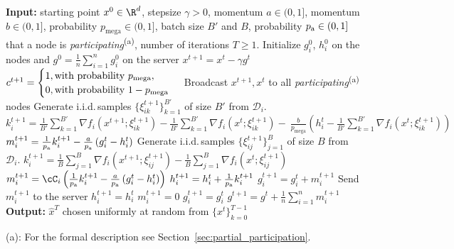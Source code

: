 \documentclass{article}
\newcommand{\algorithmname}{DASHA-PP}
\newcommand*{\probavailable}{\ensuremath{p_{\textnormal{a}}}}
\newcommand*{\probmega}{\ensuremath{p_{\text{mega}}}}
\begin{document}
  \begin{algorithm}[h]
      \caption{\algname{\algorithmname-SYNC-MVR}}
      \label{alg:main_algorithm_mvr_sync}
      \begin{algorithmic}[1]
      \STATE \textbf{Input:} starting point $x^0 \in \R^d$, stepsize $\gamma > 0$, momentum $a \in (0, 1]$, momentum $b \in (0, 1]$, probability $\probmega \in (0, 1]$, batch size $B'$ and $B$, probability $\probavailable \in (0, 1]$ that a node is \textit{participating}\textsuperscript{\red (a)}, number of iterations $T \geq 1$.
      \STATE Initialize $g^0_i$, $h^0_i$ on the nodes and $g^0 = \frac{1}{n}\sum_{i=1}^n g^0_i$ on the server
      \STATE $x^{t+1} = x^t - \gamma g^t$
      \STATE $c^{t+1} = 
      \begin{cases}
          1, \textnormal{with probability $\probmega$}, \\
          0, \textnormal{with probability $1 - \probmega$}
      \end{cases}$
      \STATE Broadcast $x^{t+1}, x^{t}$ to all \textit{participating}\textsuperscript{\red (a)} nodes
              \STATE Generate i.i.d.\,samples $\{\xi_{ik}^{t+1}\}_{k=1}^{B'}$ of size $B'$ from $\mathcal{D}_i.$
              \STATE $k^{t+1}_i = \frac{1}{B'} \sum_{k=1}^{B'} \nabla f_i(x^{t+1};\xi_{ik}^{t+1}) - \frac{1}{B'} \sum_{k=1}^{B'} \nabla f_i(x^{t};\xi_{ik}^{t+1})-~\frac{b}{\probmega}\left(h^t_i - \frac{1}{B'} \sum_{k=1}^{B'} \nabla f_i(x^{t};\xi_{ik}^{t+1})\right)$
              \STATE $m^{t+1}_i = \frac{1}{\probavailable}k^{t+1}_i - \frac{a}{\probavailable} \left(g^t_i - h^t_i\right)$ 
          \ELSE
              \STATE Generate i.i.d.\,samples $\{\xi^{t+1}_{ij}\}_{j=1}^B$ of size $B$ from $\mathcal{D}_i.$
              \STATE $k^{t+1}_i = \frac{1}{B} \sum_{j=1}^{B}\nabla f_i(x^{t+1};\xi^{t+1}_{ij}) - \frac{1}{B} \sum_{j=1}^{B}\nabla f_i(x^{t};\xi^{t+1}_{ij})$
              \STATE $m^{t+1}_i = \cC_i\left(\frac{1}{\probavailable}k^{t+1}_i - \frac{a}{\probavailable} \left(g^t_i - h^{t}_i\right)\right)$ 
          \ENDIF
          \STATE $h^{t+1}_i = h^t_i + \frac{1}{\probavailable}k^{t+1}_i$ 
          \STATE $g^{t+1}_i = g^t_i + m^{t+1}_i$
          \STATE Send $m^{t+1}_i$ to the server
      \ELSE
          \STATE $h^{t+1}_i = h^{t}_i$
          \STATE $m^{t+1}_i = 0$
          \STATE $g^{t+1}_i = g^{t}_i$
      \ENDIF
      \ENDFOR
      \STATE $g^{t+1} = g^t + \frac{1}{n} \sum_{i=1}^{n} m^{t+1}_i$
      \ENDFOR
      \STATE \textbf{Output:} $\hat{x}^T$ chosen uniformly at random from $\{x^t\}_{k=0}^{T-1}$

      {\red (a)}: For the formal description see Section~\ref{sec:partial_participation}.
      \end{algorithmic}
  \end{algorithm}
\end{document}

